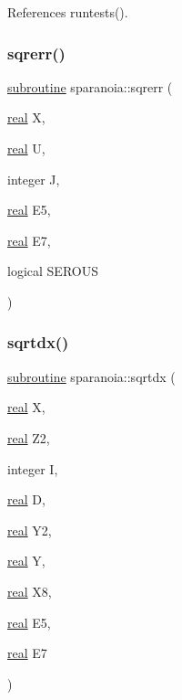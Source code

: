 References runtests().

\mbox{\label{sparanoia_8f90_a8a741debf119a02e8107542c840aa910}} 
\subsubsection{\texorpdfstring{sqrerr()}{sqrerr()}}
{\footnotesize\ttfamily \hyperlink{M__stopwatch_83_8txt_acfbcff50169d691ff02d4a123ed70482}{subroutine} sparanoia\+::sqrerr (\begin{DoxyParamCaption}\item[{\hyperlink{read__watch_83_8txt_abdb62bde002f38ef75f810d3a905a823}{real}}]{X,  }\item[{\hyperlink{read__watch_83_8txt_abdb62bde002f38ef75f810d3a905a823}{real}}]{U,  }\item[{integer}]{J,  }\item[{\hyperlink{read__watch_83_8txt_abdb62bde002f38ef75f810d3a905a823}{real}}]{E5,  }\item[{\hyperlink{read__watch_83_8txt_abdb62bde002f38ef75f810d3a905a823}{real}}]{E7,  }\item[{logical}]{S\+E\+R\+O\+US }\end{DoxyParamCaption})}

\mbox{\label{sparanoia_8f90_a010907bd382f4842772e76ab8fd7263a}} 
\subsubsection{\texorpdfstring{sqrtdx()}{sqrtdx()}}
{\footnotesize\ttfamily \hyperlink{M__stopwatch_83_8txt_acfbcff50169d691ff02d4a123ed70482}{subroutine} sparanoia\+::sqrtdx (\begin{DoxyParamCaption}\item[{\hyperlink{read__watch_83_8txt_abdb62bde002f38ef75f810d3a905a823}{real}}]{X,  }\item[{\hyperlink{read__watch_83_8txt_abdb62bde002f38ef75f810d3a905a823}{real}}]{Z2,  }\item[{integer}]{I,  }\item[{\hyperlink{read__watch_83_8txt_abdb62bde002f38ef75f810d3a905a823}{real}}]{D,  }\item[{\hyperlink{read__watch_83_8txt_abdb62bde002f38ef75f810d3a905a823}{real}}]{Y2,  }\item[{\hyperlink{read__watch_83_8txt_abdb62bde002f38ef75f810d3a905a823}{real}}]{Y,  }\item[{\hyperlink{read__watch_83_8txt_abdb62bde002f38ef75f810d3a905a823}{real}}]{X8,  }\item[{\hyperlink{read__watch_83_8txt_abdb62bde002f38ef75f810d3a905a823}{real}}]{E5,  }\item[{\hyperlink{read__watch_83_8txt_abdb62bde002f38ef75f810d3a905a823}{real}}]{E7 }\end{DoxyParamCaption})}

